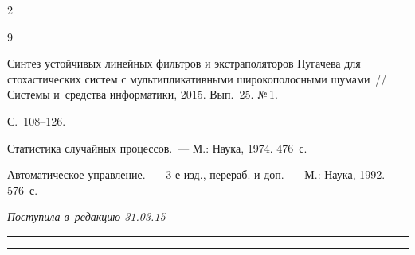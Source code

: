 \begin{multicols}{2}
{{\begin{thebibliography}{9}


Синтез устойчивых линей\-ных фильтров и экстраполяторов Пугачева для стохастических систем с мультипликативными широкополосными шумами~// Системы и~средства информатики, 2015. Вып.~25. №\,1.

С.~108--126.




 Статистика случайных процессов.~--- М.: Наука, 1974. 476~с.




 Автоматическое управление.~--- 3-е изд., перераб. и доп.~--- М.: Наука, 1992. 576~с.

 \end{thebibliography}



 }

 }



\end{multicols}



\vspace*{-3pt}



\hfill{\small\textit{Поступила в~редакцию 31.03.15}}






\vspace*{12pt}



\hrule



\vspace*{2pt}



\hrule






\def\tit{NORMAL PUGACHEV FILTERS FOR STATE LINEAR STOCHASTIC SYSTEMS}



\def\titkol{Normal Pugachev filters for state linear stochastic systems}



\def\aut{I.\,N.~Sinitsyn and E.\,R.~Korepanov}



